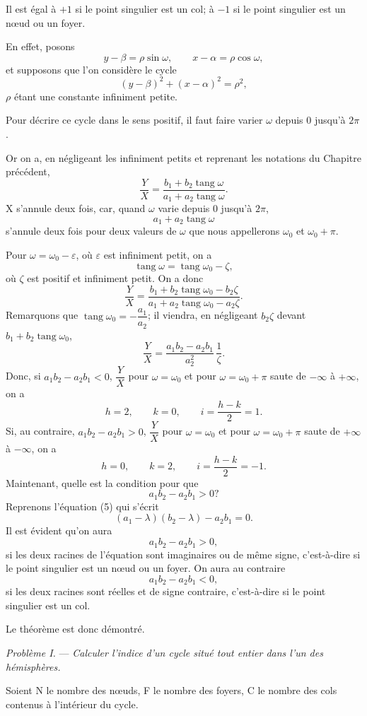 \documentclass[11pt]{article}
\begin{document}
Il est égal à $+1$ si le point singulier est un col; à $-1$ si le point singulier est un nœud ou un foyer.

En effet, posons
\[
y-\beta=\rho\sin\omega,\qquad x-\alpha=\rho\cos\omega,
\]
et supposons que l’on considère le cycle
\[
(y-\beta)^2+(x-\alpha)^2=\rho^2,
\]
$\rho$ étant une constante infiniment petite.

Pour décrire ce cycle dans le sens positif, il faut faire varier $\omega$ depuis $0$ jusqu’à $2\pi$.

Or on a, en négligeant les infiniment petits et reprenant les notations du Chapitre précédent,
\[
\frac YX=\frac{b_1+b_2\operatorname{tang}\omega}{a_1+a_2\operatorname{tang}\omega}.
\]
X s’annule deux fois, car, quand $\omega$ varie depuis $0$ jusqu’à $2\pi$,
\[
a_1+a_2\operatorname{tang}\omega
\]
s’annule deux fois pour deux valeurs de $\omega$ que nous appellerons $\omega_0$ et $\omega_0+\pi$.

Pour $\omega=\omega_0-\varepsilon$, où $\varepsilon$ est infiniment petit, on a
\[
\operatorname{tang}\omega=\operatorname{tang}\omega_0-\zeta,
\]
où $\zeta$ est positif et infiniment petit. On a donc
\[
\frac YX=\frac{b_1+b_2\operatorname{tang}\omega_0-b_2\zeta}{a_1+a_2\operatorname{tang}\omega_0-a_2\zeta}.
\]
Remarquons que $\operatorname{tang}\omega_0=-\dfrac{a_1}{a_2}$; il viendra, en négligeant $b_2\zeta$ devant $b_1+b_2\operatorname{tang}\omega_0$,
\[
\frac YX=\frac{a_1b_2-a_2b_1}{a_2^2}\,\frac1\zeta.
\]
Donc, si $a_1b_2-a_2b_1<0$, $\dfrac YX$ pour $\omega=\omega_0$ et pour $\omega=\omega_0+
\pi$ saute de $-\infty$ à $+\infty$, on a
\[
h=2,\qquad k=0,\qquad i=\frac{h-k}{2}=1.
\]
Si, au contraire, $a_1b_2-a_2b_1>0$, $\dfrac YX$ pour $\omega=\omega_0$ et pour $\omega=\omega_0+
\pi$ saute de $+\infty$ à $-\infty$, on a
\[
h=0,\qquad k=2,\qquad i=\frac{h-k}{2}=-1.
\]
Maintenant, quelle est la condition pour que
\[
a_1b_2-a_2b_1>0?
\]
Reprenons l’équation (5) qui s’écrit
\[
(a_1-\lambda)(b_2-\lambda)-a_2b_1=0.
\]
Il est évident qu’on aura
\[
a_1b_2-a_2b_1>0,
\]
si les deux racines de l’équation sont imaginaires ou de même signe, c’est-à-dire si le point singulier est un nœud ou un foyer. On aura au contraire
\[
a_1b_2-a_2b_1<0,
\]
si les deux racines sont réelles et de signe contraire, c’est-à-dire si le point singulier est un col.

Le théorème est donc démontré.

\emph{Problème I.} --- \emph{Calculer l’indice d’un cycle situé tout entier dans l’un des hémisphères.}

Soient N le nombre des nœuds, F le nombre des foyers, C le nombre des cols contenus à l’intérieur du cycle.
\end{document}
